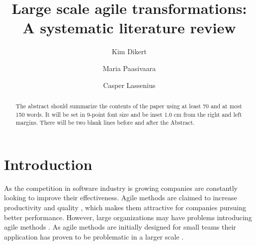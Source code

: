 \documentclass[lnbip]{svmultln}
\begin{document}

\mainmatter

\title{Large scale agile transformations: A systematic literature review}


\author{Kim Dikert \and Maria Paasivaara \and Casper Lassenius}



\maketitle



\begin{abstract}        %
The abstract should summarize the contents of the paper
using at least 70 and at most 150 words. It will be set in 9-point
font size and be inset 1.0 cm from the right and left margins.
There will be two blank lines before and after the Abstract.
\end{abstract}


\section{Introduction}

As the competition in software industry is growing companies are constantly
looking to improve their effectiveness. Agile methods are claimed to increase
productivity and quality \cite{Livermore2008}, which makes them attractive for
companies pursuing better performance. However, large organizations may have
problems introducing agile methods \cite{Dyba2009}. As agile methods are
initially designed for small teams their application has proven to be
problematic in a larger scale \cite{Boehm2005}.
\end{document}
